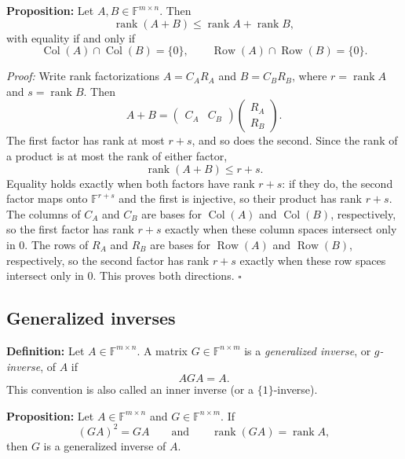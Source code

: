 \documentclass[a4paper,11pt,abstract=true]{scrartcl}
\theoremstyle{dotlessP}
\theoremstyle{dotlessS}
\theoremstyle{remark}
\theoremstyle{definition}
\begin{document}
\begin{problem_box}
\textbf{Proposition:} Let $A,B\in\mathbb{F}^{m\times n}$. Then
\[
\operatorname{rank}(A+B)\leq\operatorname{rank}A+\operatorname{rank}B,
\]
with equality if and only if
\[
\operatorname{Col}(A)\cap\operatorname{Col}(B)=\{0\},
\qquad
\operatorname{Row}(A)\cap\operatorname{Row}(B)=\{0\}.
\]
\end{problem_box}

\begin{claim_box}
\textit{Proof:} Write rank factorizations
$A=C_A R_A$ and $B=C_B R_B$, where
$r=\operatorname{rank}A$ and $s=\operatorname{rank}B$. Then
\[
A+B=
\begin{pmatrix}C_A&C_B\end{pmatrix}
\begin{pmatrix}R_A\\R_B\end{pmatrix}.
\]
The first factor has rank at most $r+s$, and so does the second.
Since the rank of a product is at most the rank of either factor,
\[
\operatorname{rank}(A+B)\leq r+s.
\]
Equality holds exactly when both factors have rank $r+s$: if they do,
 the second factor maps onto $\mathbb{F}^{r+s}$ and the first is injective,
 so their product has rank $r+s$. The columns
of $C_A$ and $C_B$ are bases for $\operatorname{Col}(A)$ and
$\operatorname{Col}(B)$, respectively, so the first factor has rank
$r+s$ exactly when these column spaces intersect only in $0$. The rows
of $R_A$ and $R_B$ are bases for $\operatorname{Row}(A)$ and
$\operatorname{Row}(B)$, respectively, so the second factor has rank
$r+s$ exactly when these row spaces intersect only in $0$. This proves
both directions. \hfill$\square$

\end{claim_box}

\subsection{Generalized inverses}

\begin{definition_box}
\textbf{Definition:} Let $A\in\mathbb{F}^{m\times n}$. A matrix
$G\in\mathbb{F}^{n\times m}$ is a \emph{generalized inverse}, or
\emph{$g$-inverse}, of $A$ if
\[
AGA=A.
\]
This convention is also called an inner inverse (or a $\{1\}$-inverse).
\end{definition_box}
\begin{problem_box}
\textbf{Proposition:} Let $A\in\mathbb{F}^{m\times n}$ and
$G\in\mathbb{F}^{n\times m}$. If
\[
(GA)^2=GA\qquad\text{and}\qquad\operatorname{rank}(GA)=\operatorname{rank}A,
\]
then $G$ is a generalized inverse of $A$.
\end{problem_box}
\end{document}
